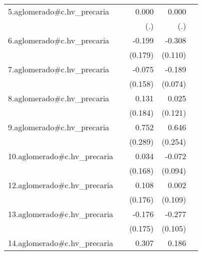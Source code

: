 {\begin{longtable}{l*{4}{D{.}{.}{-1}}}
\addlinespace
5.aglomerado#c.hv\_precaria&                     &       0.000         &       0.000         &                     \\
            &                     &         (.)         &         (.)         &                     \\
\addlinespace
6.aglomerado#c.hv\_precaria&                     &      -0.199         &      -0.308\sym{**} &                     \\
            &                     &     (0.179)         &     (0.110)         &                     \\
\addlinespace
7.aglomerado#c.hv\_precaria&                     &      -0.075         &      -0.189\sym{*}  &                     \\
            &                     &     (0.158)         &     (0.074)         &                     \\
\addlinespace
8.aglomerado#c.hv\_precaria&                     &       0.131         &       0.025         &                     \\
            &                     &     (0.184)         &     (0.121)         &                     \\
\addlinespace
9.aglomerado#c.hv\_precaria&                     &       0.752\sym{**} &       0.646\sym{*}  &                     \\
            &                     &     (0.289)         &     (0.254)         &                     \\
\addlinespace
10.aglomerado#c.hv\_precaria&                     &       0.034         &      -0.072         &                     \\
            &                     &     (0.168)         &     (0.094)         &                     \\
\addlinespace
12.aglomerado#c.hv\_precaria&                     &       0.108         &       0.002         &                     \\
            &                     &     (0.176)         &     (0.109)         &                     \\
\addlinespace
13.aglomerado#c.hv\_precaria&                     &      -0.176         &      -0.277\sym{**} &                     \\
            &                     &     (0.175)         &     (0.105)         &                     \\
\addlinespace
14.aglomerado#c.hv\_precaria&                     &       0.307         &       0.186         &                     \\

\end{longtable}}
